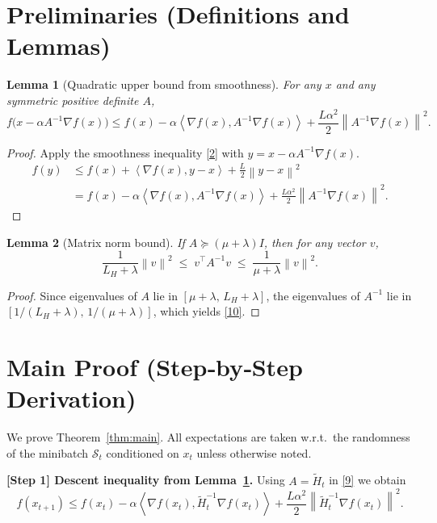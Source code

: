 \documentclass{article}
\newtheorem{lemma}{Lemma}
\newcommand{\norm}[1]{\left\|#1\right\|}
\newcommand{\ip}[2]{\left\langle #1,#2\right\rangle}
\begin{document}
\section*{Preliminaries (Definitions and Lemmas)}
\begin{lemma}[Quadratic upper bound from smoothness]\label{lem:smooth}
For any $x$ and any symmetric positive definite $A$,
\[
f\bigl(x-\alpha A^{-1}\nabla f(x)\bigr)
\le f(x)-\alpha\ip{\nabla f(x)}{A^{-1}\nabla f(x)}
+\frac{L\alpha^{2}}{2}\norm{A^{-1}\nabla f(x)}^{2}.
\tag{9}
\]
\end{lemma}
\begin{proof}
Apply the smoothness inequality \eqref{2} with $y=x-\alpha A^{-1}\nabla f(x)$.
\[
\begin{aligned}
f(y) &\le f(x)+\ip{\nabla f(x)}{y-x}
       +\frac{L}{2}\norm{y-x}^{2}\\
     &= f(x)-\alpha\ip{\nabla f(x)}{A^{-1}\nabla f(x)}
        +\frac{L\alpha^{2}}{2}\norm{A^{-1}\nabla f(x)}^{2}.
\end{aligned}
\]
\end{proof}

\begin{lemma}[Matrix norm bound]\label{lem:matnorm}
If $A\succeq (\mu+\lambda)I$, then for any vector $v$,
\[
\frac{1}{L_H+\lambda}\norm{v}^{2}
\;\le\;
v^{\!\top}A^{-1}v
\;\le\;
\frac{1}{\mu+\lambda}\norm{v}^{2}.
\tag{10}
\]
\end{lemma}
\begin{proof}
Since eigenvalues of $A$ lie in $[\mu+\lambda,\,L_H+\lambda]$, the eigenvalues of $A^{-1}$
lie in $[1/(L_H+\lambda),\,1/(\mu+\lambda)]$, which yields \eqref{10}.
\end{proof}

\section*{Main Proof (Step‑by‑Step Derivation)}
We prove Theorem~\ref{thm:main}.  All expectations are taken w.r.t.\ the
randomness of the minibatch $\mathcal S_t$ conditioned on $x_t$ unless otherwise noted.

\medskip
\noindent\textbf{[Step 1] Descent inequality from Lemma~\ref{lem:smooth}.}  
Using $A=\tilde H_t$ in \eqref{9} we obtain
\begin{equation}
f(x_{t+1})
\le f(x_t)-\alpha\ip{\nabla f(x_t)}{\tilde H_t^{-1}\nabla f(x_t)}
     +\frac{L\alpha^{2}}{2}\norm{\tilde H_t^{-1}\nabla f(x_t)}^{2}.
\tag{11}
\end{equation}
\end{document}
